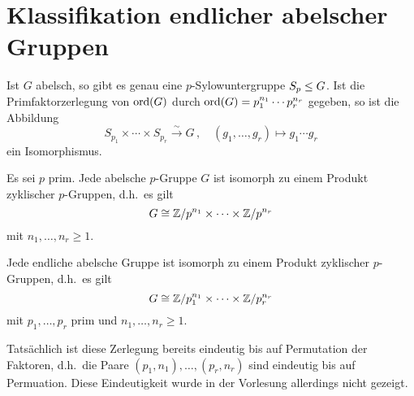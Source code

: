 \section{Klassifikation endlicher abelscher Gruppen}

\begin{theorem}
  Ist $G$ abelsch, so gibt es genau eine $p$-Sylowuntergruppe $S_p \mathrel{\leq} G$.
  Ist die Primfaktorzerlegung von $\operatorname{ord}(G)$ durch $\operatorname{ord}(G) = p_1^{n_1} \dotsm p_r^{n_r}$ gegeben, so ist die Abbildung
  \[
                        S_{p_1} \times \dotsb \times S_{p_r}
    \xrightarrow{\sim}  G \,,
    \quad               (g_1, \dotsc, g_r)
    \mapsto             g_1 \dotsm g_r
  \]
  ein Isomorphismus.
\end{theorem}

\begin{proposition}
  Es sei $p$ prim.
  Jede abelsche $p$-Gruppe $G$ ist isomorph zu einem Produkt zyklischer $p$-Gruppen, d.h.\ es gilt
  \[
          G
    \cong \mathbb{Z}/p^{n_1} \times \dotsm \times \mathbb{Z}/p^{n_r}
  \]
  mit $n_1, \dotsc, n_r \geq 1$.
\end{proposition}

\begin{corollary}
  Jede endliche abelsche Gruppe ist isomorph zu einem Produkt zyklischer $p$-Gruppen, d.h.\ es gilt
  \[
          G
    \cong \mathbb{Z}/p_1^{n_1} \times \dotsm \times \mathbb{Z}/p_r^{n_r}
  \]
  mit $p_1, \dotsc, p_r$ prim und $n_1, \dotsc, n_r \geq 1$.
\end{corollary}

\begin{remark}
  Tatsächlich ist diese Zerlegung bereits eindeutig bis auf Permutation der Faktoren, d.h.\ die Paare $(p_1, n_1), \dotsc, (p_r, n_r)$ sind eindeutig bis auf Permuation.
  Diese Eindeutigkeit wurde in der Vorlesung allerdings nicht gezeigt.
\end{remark}




